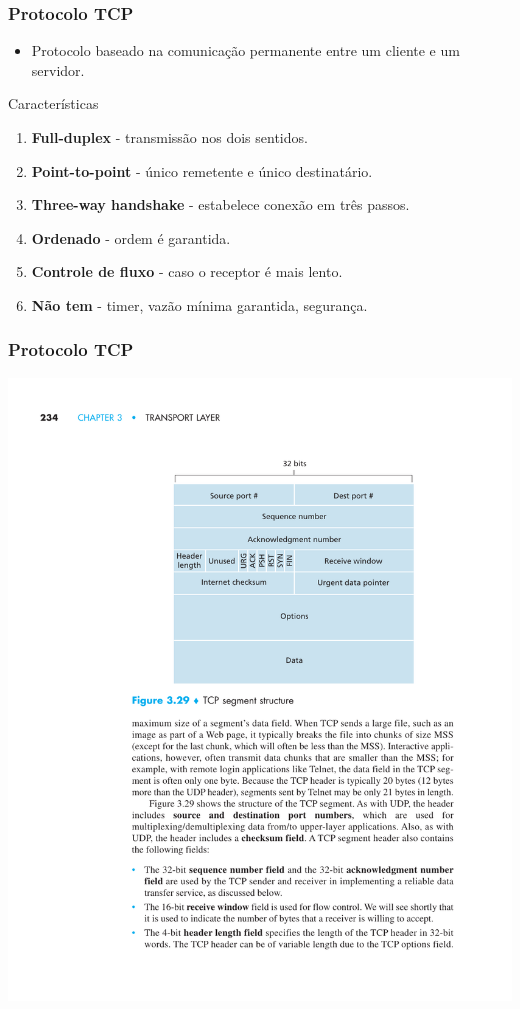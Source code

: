 \documentclass[xcolor=dvipsnames,10pt,compress,aspectratio=169]{beamer}
\begin{document}
\begin{frame}
  \frametitle{Protocolo TCP}
  \begin{itemize}
  \item Protocolo baseado na comunicação permanente entre um cliente e um servidor.
  \end{itemize}
  \begin{exampleblock}{Características}
    \begin{enumerate}
    \item {\bf Full-duplex} - transmissão nos dois sentidos.
    \item {\bf Point-to-point} - único remetente e único destinatário.
    \item {\bf Three-way handshake} - estabelece conexão em três passos.
    \item {\bf Ordenado} - ordem é garantida.
    \item {\bf Controle de fluxo} - caso o receptor é mais lento.
    \item {\bf Não tem} - timer, vazão mínima garantida, segurança.
    \end{enumerate}
  \end{exampleblock}
\end{frame}
\begin{frame}
  \frametitle{Protocolo TCP}
  \begin{center}
  \includegraphics[scale=0.8]{kurose-03-29}
  \end{center}
\end{frame}
\end{document}
